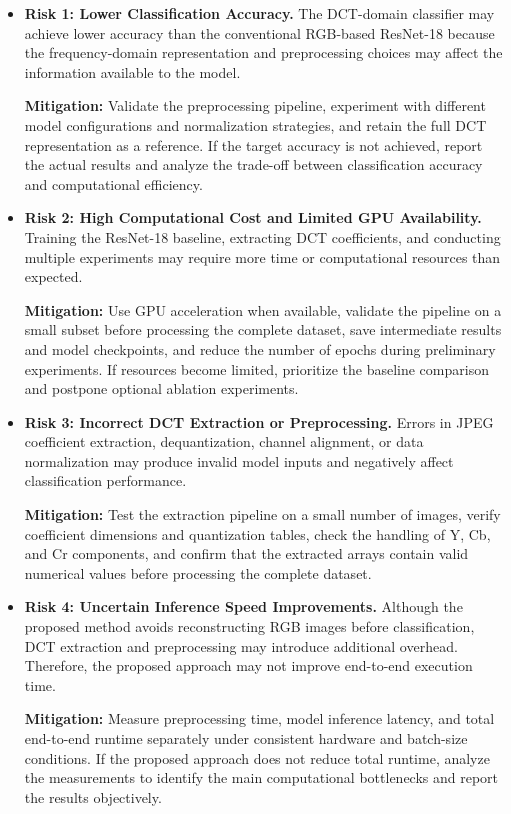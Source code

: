 \documentclass[11pt]{article}
\begin{document}
\begin{itemize}[leftmargin=*]

    \item \textbf{Risk 1: Lower Classification Accuracy.}
    The DCT-domain classifier may achieve lower accuracy than the
    conventional RGB-based ResNet-18 because the frequency-domain
    representation and preprocessing choices may affect the information
    available to the model.

    \textbf{Mitigation:} Validate the preprocessing pipeline, experiment
    with different model configurations and normalization strategies,
    and retain the full DCT representation as a reference. If the target
    accuracy is not achieved, report the actual results and analyze the
    trade-off between classification accuracy and computational efficiency.

    \item \textbf{Risk 2: High Computational Cost and Limited GPU
    Availability.}
    Training the ResNet-18 baseline, extracting DCT coefficients, and
    conducting multiple experiments may require more time or
    computational resources than expected.

    \textbf{Mitigation:} Use GPU acceleration when available, validate
    the pipeline on a small subset before processing the complete
    dataset, save intermediate results and model checkpoints, and
    reduce the number of epochs during preliminary experiments.
    If resources become limited, prioritize the baseline comparison
    and postpone optional ablation experiments.

    \item \textbf{Risk 3: Incorrect DCT Extraction or Preprocessing.}
    Errors in JPEG coefficient extraction, dequantization, channel
    alignment, or data normalization may produce invalid model inputs
    and negatively affect classification performance.

    \textbf{Mitigation:} Test the extraction pipeline on a small number
    of images, verify coefficient dimensions and quantization tables,
    check the handling of Y, Cb, and Cr components, and confirm that
    the extracted arrays contain valid numerical values before
    processing the complete dataset.

    \item \textbf{Risk 4: Uncertain Inference Speed Improvements.}
    Although the proposed method avoids reconstructing RGB images
    before classification, DCT extraction and preprocessing may
    introduce additional overhead. Therefore, the proposed approach
    may not improve end-to-end execution time.

    \textbf{Mitigation:} Measure preprocessing time, model inference
    latency, and total end-to-end runtime separately under consistent
    hardware and batch-size conditions. If the proposed approach does
    not reduce total runtime, analyze the measurements to identify
    the main computational bottlenecks and report the results
    objectively.

\end{itemize}
\end{document}
